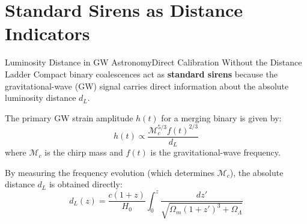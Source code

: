 \section{Standard Sirens as Distance Indicators}

\begin{frame}{Luminosity Distance in GW Astronomy}{Direct Calibration Without the Distance Ladder}
  Compact binary coalescences act as \textbf{standard sirens} because the gravitational-wave (GW) signal carries direct information about the absolute luminosity distance $d_L$.
  
  \vspace{0.3cm}
  The primary GW strain amplitude $h(t)$ for a merging binary is given by:
  \begin{equation}
    h(t) \propto \frac{\mathcal{M}_c^{5/3} f(t)^{2/3}}{d_L}
  \end{equation}
  where $\mathcal{M}_c$ is the chirp mass and $f(t)$ is the gravitational-wave frequency.
  
  \vspace{0.3cm}
  By measuring the frequency evolution (which determines $\mathcal{M}_c$), the absolute distance $d_L$ is obtained directly:
  \begin{equation}
    d_L(z) = \frac{c(1+z)}{H_0} \int_0^z \frac{dz'}{\sqrt{\Omega_m(1+z')^3 + \Omega_\Lambda}}
  \end{equation}
\end{frame}

